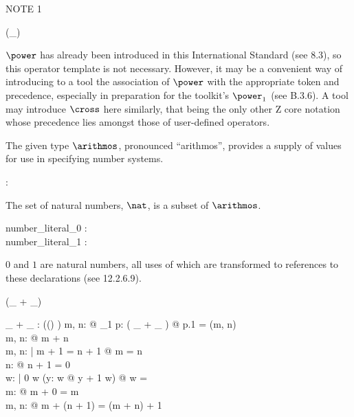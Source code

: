 \documentclass{article}
\begin{document}
NOTE 1
\begin{zed}
\generic (\power \_)
\end{zed}
$\power$ has already been introduced in this International Standard
(see 8.3),
so this operator template is not necessary.
However, it may be a convenient way of introducing to a tool
the association of $\power$ with the appropriate token and precedence,
especially in preparation for the toolkit's $\power_1$ (see B.3.6).
A tool may introduce $\cross$ here similarly,
that being the only other Z core notation whose precedence
lies amongst those of user-defined operators.


\begin{zed}
[\arithmos]
\end{zed}

The given type $\arithmos$, pronounced ``arithmos'', provides
a supply of values for use in specifying number systems.

\begin{axdef}
\nat : \power \arithmos
\end{axdef}

The set of natural numbers, $\nat$, is a subset of $\arithmos$.


\begin{axdef}
  number\_literal\_0 : \nat\\
  number\_literal\_1 : \nat
\end{axdef}

$0$ and $1$ are natural numbers, all uses of which are transformed
to references to these declarations (see 12.2.6.9).

\begin{zed}
 \leftassoc (\_ + \_)
\end{zed}

\begin{axdef}
\_ + \_ : \power ((\arithmos \cross \arithmos) \cross \arithmos)
\where
\forall m, n: \nat @ \exists_1 p: ( \_ + \_ ) @ p.1 = (m, n)\\
\forall m, n: \nat @ m + n \in \nat\\
\forall m, n: \nat | m + 1 = n + 1 @ m = n\\
\forall n: \nat @ \lnot n + 1 = 0\\
\forall w: \power \nat | 0 \in w \land (\forall y: w @ y + 1 \in w) @ w = \nat\\
\forall m: \nat @ m + 0 = m\\
\forall m, n: \nat @ m + (n + 1) = (m + n) + 1
\end{axdef}
\end{document}
